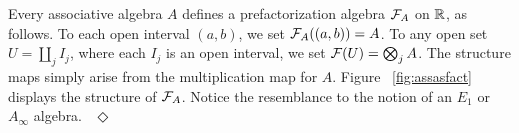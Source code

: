 \documentclass[11pt]{amsart}
\begin{document}
\begin{eg}\label{ex:associativealgebra}
Every associative algebra $A$ defines a prefactorization algebra $\mathcal F_A$ on $\mathbb R$, as follows. To each open interval $(a,b)$, we set $\mathcal F_A( (a,b) ) = A$. To any open set $U = \coprod_j I_j$, where each $I_j$ is an open interval, we set $\mathcal F(U) = \bigotimes_j A$. The structure maps simply arise from the multiplication map for $A$. Figure ~\ref{fig:assasfact} displays the structure of $\mathcal F_A$. Notice the resemblance to the notion of an $E_1$ or $A_\infty$ algebra. 
~\hfill$\Diamond$
\end{eg}

\end{document}
